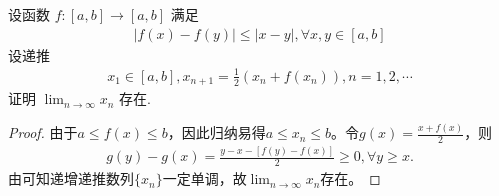 \documentclass[../../main.tex]{subfiles}%
\begin{document}
\begin{example}
设函数 $f:[a,b] \to [a,b]$ 满足
\begin{align*}
|f(x) - f(y)| \leqslant |x - y|, \forall x,y \in [a,b]
\end{align*}
设递推
\begin{align*}
x_1 \in [a,b], x_{n+1} = \frac{1}{2}(x_n + f(x_n)), n = 1,2,\cdots
\end{align*}
证明 $\lim_{n \to \infty} x_n$ 存在.
\end{example}
\begin{proof}

由于$a \leqslant f(x) \leqslant b$，因此归纳易得$a \leqslant x_n \leqslant b$。令$g(x) = \frac{x + f(x)}{2}$，则
\begin{align*}
g(y) - g(x) = \frac{y - x - [f(y) - f(x)]}{2} \geqslant 0, \forall y \geqslant x.
\end{align*}
由可知递增递推数列$\{ x_n \}$一定单调，故$\lim_{n \to \infty} x_n$存在。

\end{proof}
\end{document}

